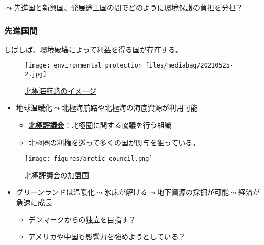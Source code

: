 \documentclass[
  xelatex,
  ja=standard]{bxjsarticle}
\providecommand{\tightlist}{%
  \setlength{\itemsep}{0pt}\setlength{\parskip}{0pt}}\usepackage{longtable,booktabs,array}
\begin{document}
\(\leadsto\)先進国と新興国、発展途上国の間でどのように環境保護の負担を分担？

\hypertarget{ux5148ux9032ux56fdux9593}{%
\subsubsection{先進国間}\label{ux5148ux9032ux56fdux9593}}

しばしば、環境破壊によって利益を得る国が存在する。

\begin{figure}[htpb]

{\centering \texttt{[image: environmental\_protection\_files/mediabag/20210525-2.jpg]}

}

\caption{\href{https://financial.jiji.com/magazine_bk/back_number.html?number=155}{北極海航路のイメージ}}

\end{figure}

\begin{itemize}
\tightlist
\item
  地球温暖化\(\leadsto\)北極海航路や北極海の海底資源が利用可能

  \begin{itemize}
  \tightlist
  \item
    \href{https://www.mofa.go.jp/mofaj/area/arctic/hokkyoku_hyougikai.html}{\textbf{北極評議会}}：北極圏に関する協議を行う組織
  \item
    北極圏の利権を巡って多くの国が関与を狙っている。
  \end{itemize}
\end{itemize}

\begin{figure}[htpb]

{\centering \texttt{[image: figures/arctic\_council.png]}

}

\caption{\href{https://commons.wikimedia.org/wiki/File:ArcticCouncil.svg}{北極評議会の加盟国}}

\end{figure}

\begin{itemize}
\tightlist
\item
  グリーンランドは温暖化\(\leadsto\)氷床が解ける\(\leadsto\)地下資源の採掘が可能\(\leadsto\)経済が急速に成長

  \begin{itemize}
  \tightlist
  \item
    デンマークからの独立を目指す？
  \item
    アメリカや中国も影響力を強めようとしている？
  \end{itemize}
\end{itemize}
\end{document}
